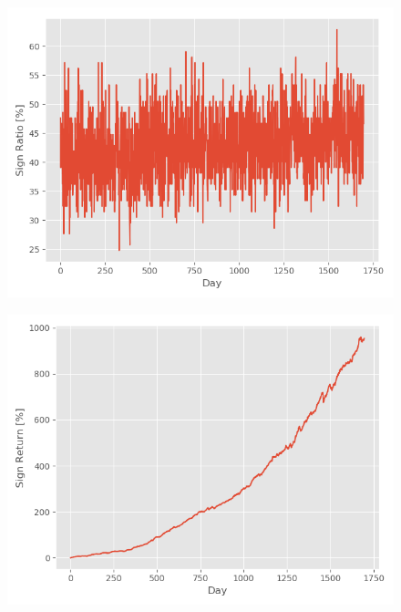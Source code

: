 \newpage
\begin{figure}
\centering
\begin{minipage}{.5\textwidth}
  \centering
  \includegraphics[scale=0.5]{Plot/EvaluationSignRatio.png}
  \label{SignRatio}
\end{minipage}%
\begin{minipage}{.5\textwidth}
  \centering
  \includegraphics[scale=0.5]{Plot/EvaluationSignReturn.png}
  \label{SignReturn}
\end{minipage}
\end{figure}


